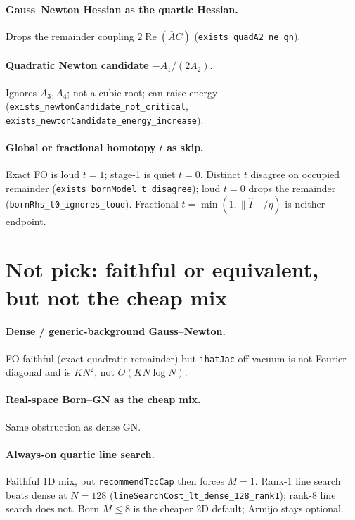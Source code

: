 \documentclass[11pt,a4paper]{article}
\theoremstyle{definition}
\theoremstyle{remark}
\newcommand{\conj}[1]{\overline{#1}}
\newcommand{\norm}[1]{\lVert#1\rVert}
\begin{document}
\paragraph{Gauss--Newton Hessian as the quartic Hessian.}
Drops the remainder coupling $2\operatorname{Re}(\conj{A}C)$
(\texttt{exists\_quadA2\_ne\_gn}).

\paragraph{Quadratic Newton candidate $-A_1/(2A_2)$.}
Ignores $A_3,A_4$; not a cubic root; can raise energy
(\texttt{exists\_newtonCandidate\_not\_critical},
\texttt{exists\_newtonCandidate\_energy\_increase}).

\paragraph{Global or fractional homotopy $t$ as skip.}
Exact FO is loud $t=1$; stage-1 is quiet $t=0$.
Distinct $t$ disagree on occupied remainder
(\texttt{exists\_bornModel\_t\_disagree});
loud $t=0$ drops the remainder
(\texttt{bornRhs\_t0\_ignores\_loud}).
Fractional $t=\min(1,\norm{\hat I}/\eta)$ is neither endpoint.

\section{Not pick: faithful or equivalent, but not the cheap mix}
\label{sec:cost}

\paragraph{Dense / generic-background Gauss--Newton.}
FO-faithful (exact quadratic remainder) but \texttt{ihatJac} off vacuum
is not Fourier-diagonal and is $KN^2$, not $O(KN\log N)$.

\paragraph{Real-space Born--GN as the cheap mix.}
Same obstruction as dense GN.

\paragraph{Always-on quartic line search.}
Faithful 1D mix, but \texttt{recommendTccCap} then forces $M=1$.
Rank-1 line search beats dense at $N=128$
(\texttt{lineSearchCost\_lt\_dense\_128\_rank1}); rank-8 line search
does not.
Born $M\le 8$ is the cheaper 2D default; Armijo stays optional.
\end{document}
